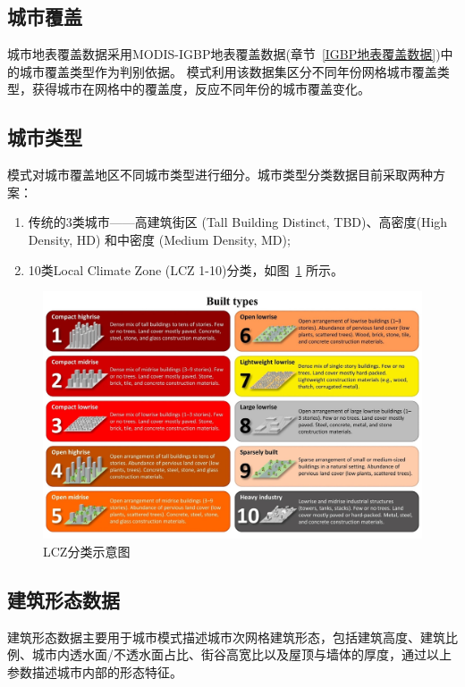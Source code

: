 \subsection{城市覆盖}\label{城市覆盖}
城市地表覆盖数据采用MODIS-IGBP地表覆盖数据(章节~\ref{IGBP地表覆盖数据})中的城市覆盖类型作为判别依据。
模式利用该数据集区分不同年份网格城市覆盖类型，获得城市在网格中的覆盖度，反应不同年份的城市覆盖变化。


\subsection{城市类型}\label{城市类型}
模式对城市覆盖地区不同城市类型进行细分。城市类型分类数据目前采取两种方案：
\begin{enumerate}
  \item 传统的3类城市——高建筑街区 (Tall Building Distinct, TBD)、高密度(High Density, HD) 和中密度 (Medium Density, MD);
  \item 10类Local Climate Zone (LCZ 1-10)分类，如图~\ref{fig:LCZ分类图示}  所示。
\end{enumerate}

{
  \begin{figure}[htbp]
    \centering
    \includegraphics[width=\textwidth]{Figures/基础数据/LCZ分类图示.jpg}
    \caption[LCZ分类示意图]{LCZ分类示意图~\citep{demuzere2020combining,stewart2012local}}
    \label{fig:LCZ分类图示}
  \end{figure}
}


\subsection{建筑形态数据}\label{建筑形态数据}
建筑形态数据主要用于城市模式描述城市次网格建筑形态，包括建筑高度、建筑比例、城市内透水面/不透水面占比、街谷高宽比以及屋顶与墙体的厚度，通过以上参数描述城市内部的形态特征。

